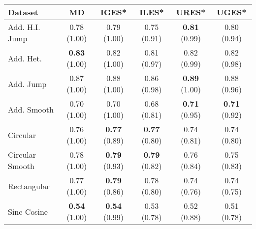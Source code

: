 \begin{tabular}{lccccc}
\toprule
Dataset & MD & IGES* & ILES* & URES* & UGES* \\
\midrule
Add. H.I. Jump & 0.78 (1.00) & 0.79 (1.00) & 0.75 (0.91) & \textbf{0.81} (0.99) & 0.80 (0.94) \\
Add. Het. & \textbf{0.83} (1.00) & 0.82 (1.00) & 0.81 (0.97) & 0.82 (0.99) & 0.82 (0.98) \\
Add. Jump & 0.87 (1.00) & 0.88 (1.00) & 0.86 (0.98) & \textbf{0.89} (1.00) & 0.88 (0.96) \\
Add. Smooth & 0.70 (1.00) & 0.70 (1.00) & 0.68 (0.81) & \textbf{0.71} (0.95) & \textbf{0.71} (0.92) \\
Circular & 0.76 (1.00) & \textbf{0.77} (0.89) & \textbf{0.77} (0.80) & 0.74 (0.81) & 0.74 (0.80) \\
Circular Smooth & 0.78 (1.00) & \textbf{0.79} (0.93) & \textbf{0.79} (0.82) & 0.76 (0.84) & 0.75 (0.83) \\
Rectangular & 0.77 (1.00) & \textbf{0.79} (0.86) & 0.78 (0.80) & 0.74 (0.76) & 0.74 (0.75) \\
Sine Cosine & \textbf{0.54} (1.00) & \textbf{0.54} (0.99) & 0.53 (0.78) & 0.52 (0.88) & 0.51 (0.78) \\
\bottomrule
\end{tabular}
